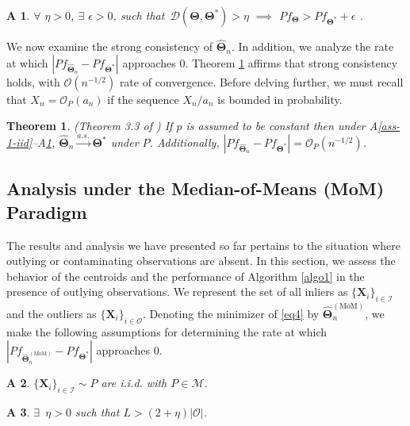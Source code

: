 \documentclass[12pt]{article}
\newcommand{\bX}{\boldsymbol{X}}
\newcommand{\bTheta}{\boldsymbol{\Theta}}
\newcommand{\I}{\mathcal{I}}
\newcommand{\cO}{\mathcal{O}}
\newcommand{\hth}{\widehat{\bTheta}_n}
\newcommand{\tm}{\widehat{\bTheta}_n^{(\text{MoM})}}
\newtheorem{thm}{Theorem}[section]
\newtheorem{assumption}{A\hspace{-2pt}}
\begin{document}
\begin{assumption}\label{ass-3-diss}
    $\forall$ $ \eta>0$, $\exists$ $\epsilon>0$, such that $\, \mathcal{D}(\bTheta,\bTheta^\ast)> \eta$ $\implies$ $P f_{\bTheta} > P f_{\bTheta^\ast} + \epsilon$ .
\end{assumption}

We now examine the strong consistency of $\hth$. In addition, we analyze the rate at which $|P f_{\hth} - P f_{\bTheta^\ast}|$ approaches $0$. Theorem \ref{thm-3-strong-consistency} affirms that strong consistency holds, with $\mathcal{O}(n^{-1/2})$ rate of convergence. Before delving further, we must recall that $X_n = \mathcal{O}_P(a_n)$ if the sequence $X_n/a_n$ is bounded in probability.

\begin{thm}\label{thm-3-strong-consistency}
(Theorem 3.3 of \cite{paul2021uniform}) If $p$ is assumed to be constant then under  A\ref{ass-1-iid}--A\ref{ass-3-diss}, $\hth \xrightarrow{a.s.} \bTheta^\ast$ under $P$. Additionally, $|P f_{\hth} - P f_{\bTheta^\ast}| = \mathcal{O}_P (n^{-1/2})$.
\end{thm}


\subsection{Analysis under the Median-of-Means (MoM) Paradigm}

The results and analysis we have presented so far pertains to the situation where outlying or contaminating observations are absent. In this section, we assess the behavior of the centroids and the performance of Algorithm \ref{algo1} in the presence of outlying observations. %
  We represent the set of all inliers as $\{\bX_i\}_{i \in \I}$ and the outliers as $\{\bX_i\}_{i \in \cO}$. Denoting the  minimizer of \eqref{eq4} by $\tm$, we make the following assumptions for determining the rate at which $|Pf_{\tm} - Pf_{\bTheta^\ast}|$ approaches $0$. %

\begin{assumption}\label{ass-4-iid}
    $\{\bX_i\}_{i \in \I}\sim P$ are i.i.d. with $P \in \mathcal{M}$.
\end{assumption}

\begin{assumption}\label{ass-5-L}
    $\exists$ $\, \eta > 0$ such that $L>(2+\eta)|\cO|$.
\end{assumption}
\end{document}
